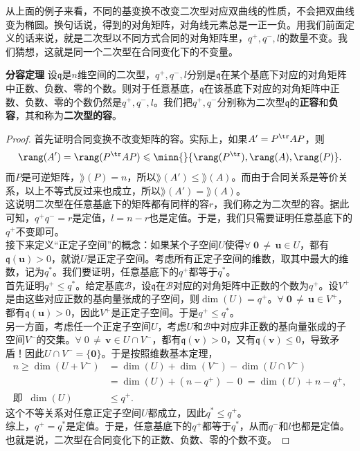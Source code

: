 \documentclass[12pt,UTF8]{ctexbook}
\begin{document}
从上面的例子来看，不同的基变换不改变二次型对应双曲线的性质，不会把双曲线变为椭圆。换句话说，得到的对角矩阵，对角线元素总是一正一负。用我们前面定义的话来说，就是二次型以不同方式合同的对角矩阵里，$q^+, q^-, l$的数量不变。我们猜想，这就是同一个二次型在合同变化下的不变量。

\begin{tm}{\textbf{分容定理}}
    设$\mathfrak{q}$是$n$维空间的二次型，$q^+, q^-, l$分别是$\mathfrak{q}$在某个基底下对应的对角矩阵中正数、负数、零的个数。则对于任意基底，$\mathfrak{q}$在该基底下对应的对角矩阵中正数、负数、零的个数仍然是$q^+, q^-, l$。我们把$q^+, q^-$分别称为二次型$\mathfrak{q}$的\textbf{正容}和\textbf{负容}，其和称为\textbf{二次型的容}。    
\end{tm}

\begin{proof}
    首先证明合同变换不改变矩阵的容。实际上，如果$A' = P^{\tr} A P$，则
    $$\rang(A') = \rang(P^{\tr} A P) \leqslant \minn{}\{\rang(P^{\tr}), \rang(A), \rang(P)\}.$$
    而$P$是可逆矩阵，$\rang(P) = n$，所以$\rang(A') \leqslant \rang(A)$。而由于合同关系是等价关系，以上不等式反过来也成立，所以$\rang(A') = \rang(A)$。\\
    这说明二次型在任意基底下的矩阵都有同样的容$r$，我们称之为二次型的容。据此可知，$q^ + q^- = r$是定值，$l = n - r$也是定值。于是，我们只需要证明任意基底下的$q^+$不变即可。\\
    接下来定义“正定子空间”的概念：如果某个子空间$U$使得$\forall \;\mathbf{0}\,\neq\, \mathbf{u}\in U$，都有$\mathfrak{q}(\mathbf{u}) > 0$，就说$U$是正定子空间。考虑所有正定子空间的维数，取其中最大的维数，记为$q^*$。我们要证明，任意基底下的$q^+$都等于$q^*$。\\
    首先证明$q^+ \leqslant q^*$。给定基底$\mathcal{B}$，设$\mathfrak{q}$在$\mathcal{B}$对应的对角矩阵中正数的个数为$q^+$。设$V^+$是由这些对应正数的基向量张成的子空间，则$\dim(U) = q^+$。$\forall \;\mathbf{0}\,\neq\, \mathbf{u}\in V^+$，都有$\mathfrak{q}(\mathbf{u}) > 0$，因此$V^+$是正定子空间。于是$q^+ \leqslant q^*$。\\
    另一方面，考虑任一个正定子空间$U$，考虑$U$和$\mathcal{B}$中对应非正数的基向量张成的子空间$V^-$的交集。$\forall \; 0 \,\neq \,\mathbf{v} \in U \cap V^-$，都有$\mathfrak{q}(\mathbf{v}) > 0$，又有$\mathfrak{q}(\mathbf{v}) \leqslant 0$，导致矛盾！因此$U \cap V^- = \{\mathbf{0}\}$。于是按照维数基本定理，
    \begin{align*}
        n \geqslant \dim(U + V^-) &= \dim(U) + \dim(V^-) - \dim(U \cap V^-) \\
        &= \dim(U) + (n - q^+)\, -\, 0 \; = \dim(U) + n - q^+,\\
        \mbox{即}\;\;\dim(U) &\leqslant q^+.
    \end{align*}
    这个不等关系对任意正定子空间$U$都成立，因此$q^* \leqslant q^+$。\\
    综上，$q^+ = q^*$是定值。于是，任意基底下的$q^+$都等于$q^*$，从而$q^-$和$l$也都是定值。也就是说，二次型在合同变化下的正数、负数、零的个数不变。
\end{proof}
\end{document}
